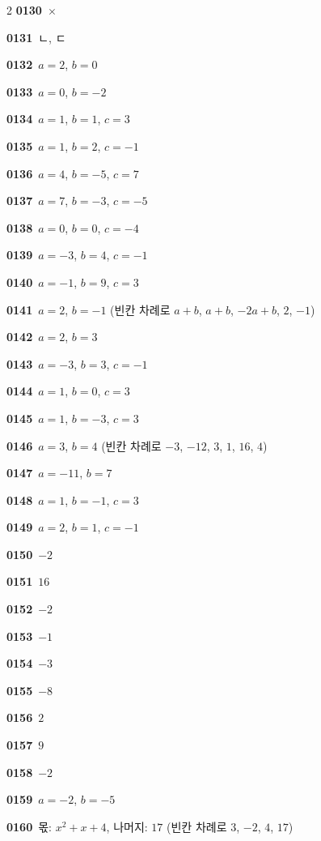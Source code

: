 \documentclass[10pt,a4paper]{article}
\begin{document}
\begin{multicols}{2}
\noindent\textbf{0130}\ $\times$\par
\noindent\textbf{0131}\ ㄴ, ㄷ\par
\noindent\textbf{0132}\ $a=2$, $b=0$\par
\noindent\textbf{0133}\ $a=0$, $b=-2$\par
\noindent\textbf{0134}\ $a=1$, $b=1$, $c=3$\par
\noindent\textbf{0135}\ $a=1$, $b=2$, $c=-1$\par
\noindent\textbf{0136}\ $a=4$, $b=-5$, $c=7$\par
\noindent\textbf{0137}\ $a=7$, $b=-3$, $c=-5$\par
\noindent\textbf{0138}\ $a=0$, $b=0$, $c=-4$\par
\noindent\textbf{0139}\ $a=-3$, $b=4$, $c=-1$\par
\noindent\textbf{0140}\ $a=-1$, $b=9$, $c=3$\par
\noindent\textbf{0141}\ $a=2$, $b=-1$ (빈칸 차례로 $a+b$, $a+b$, $-2a+b$, $2$, $-1$)\par
\noindent\textbf{0142}\ $a=2$, $b=3$\par
\noindent\textbf{0143}\ $a=-3$, $b=3$, $c=-1$\par
\noindent\textbf{0144}\ $a=1$, $b=0$, $c=3$\par
\noindent\textbf{0145}\ $a=1$, $b=-3$, $c=3$\par
\noindent\textbf{0146}\ $a=3$, $b=4$ (빈칸 차례로 $-3$, $-12$, $3$, $1$, $16$, $4$)\par
\noindent\textbf{0147}\ $a=-11$, $b=7$\par
\noindent\textbf{0148}\ $a=1$, $b=-1$, $c=3$\par
\noindent\textbf{0149}\ $a=2$, $b=1$, $c=-1$\par
\noindent\textbf{0150}\ $-2$\par
\noindent\textbf{0151}\ $16$\par
\noindent\textbf{0152}\ $-2$\par
\noindent\textbf{0153}\ $-1$\par
\noindent\textbf{0154}\ $-3$\par
\noindent\textbf{0155}\ $-8$\par
\noindent\textbf{0156}\ $2$\par
\noindent\textbf{0157}\ $9$\par
\noindent\textbf{0158}\ $-2$\par
\noindent\textbf{0159}\ $a=-2$, $b=-5$\par
\noindent\textbf{0160}\ 몫: $x^2+x+4$, 나머지: $17$ (빈칸 차례로 $3$, $-2$, $4$, $17$)\par

\end{multicols}
\end{document}

